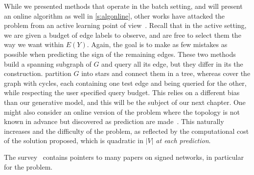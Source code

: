 \begin{newcontent}
While we presented methods that operate in the batch setting, and will present an online algorithm
as well in \autoref{s:algonline}, other works have attacked the \esp{} problem from an active
learning point of view~\autocites{Cesa-Bianchi2012a}{Cesa-Bianchi2012b}.  Recall that in the active
setting, we are given a budget of edge labels to observe, and are free to select them the way we
want within $E(Y)$. Again, the goal is to make as few mistakes as possible when predicting the sign
of the remaining edges. These two methods build a spanning subgraph of $G$ and query all its edge,
but they differ in its the construction. \Textcite{Cesa-Bianchi2012a} partition $G$ into stars and
connect them in a tree, whereas \textcite{Cesa-Bianchi2012b} cover the graph with cycles, each
containing one test edge and being queried for the other, while respecting the user specified query
budget.  This relies on a different bias than our generative model, and this will be the subject of
our next chapter.  One might also consider an online version of the problem where the topology is
not known in advance but discovered as prediction are made~\autocite{Gentile2013}. This naturally
increases and the difficulty of the problem, as reflected by the computational cost of the solution
proposed, which is quadratic in $|V|$ \emph{at each prediction}.
\end{newcontent}

The survey~\autocite{Tang2015a} contains pointers to many papers on signed networks, in particular
for the \esp{} problem.
